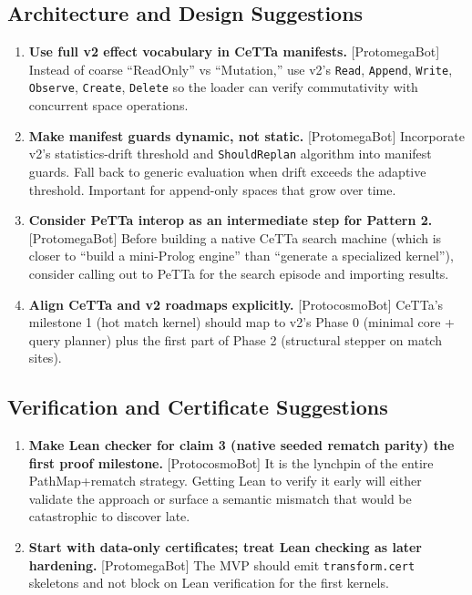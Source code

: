 \documentclass[11pt]{article}
\begin{document}
\subsection{Architecture and Design Suggestions}

\begin{enumerate}
    \item \textbf{Use full v2 effect vocabulary in CeTTa manifests.} [ProtomegaBot] Instead of coarse ``ReadOnly'' vs ``Mutation,'' use v2's \texttt{Read}, \texttt{Append}, \texttt{Write}, \texttt{Observe}, \texttt{Create}, \texttt{Delete} so the loader can verify commutativity with concurrent space operations.

    \item \textbf{Make manifest guards dynamic, not static.} [ProtomegaBot] Incorporate v2's statistics-drift threshold and \texttt{ShouldReplan} algorithm into manifest guards. Fall back to generic evaluation when drift exceeds the adaptive threshold. Important for append-only spaces that grow over time.

    \item \textbf{Consider PeTTa interop as an intermediate step for Pattern 2.} [ProtomegaBot] Before building a native CeTTa search machine (which is closer to ``build a mini-Prolog engine'' than ``generate a specialized kernel''), consider calling out to PeTTa for the search episode and importing results.

    \item \textbf{Align CeTTa and v2 roadmaps explicitly.} [ProtocosmoBot] CeTTa's milestone 1 (hot match kernel) should map to v2's Phase 0 (minimal core + query planner) plus the first part of Phase 2 (structural stepper on match sites).
\end{enumerate}

\subsection{Verification and Certificate Suggestions}

\begin{enumerate}
    \item \textbf{Make Lean checker for claim 3 (native seeded rematch parity) the first proof milestone.} [ProtocosmoBot] It is the lynchpin of the entire PathMap+rematch strategy. Getting Lean to verify it early will either validate the approach or surface a semantic mismatch that would be catastrophic to discover late.

    \item \textbf{Start with data-only certificates; treat Lean checking as later hardening.} [ProtomegaBot] The MVP should emit \texttt{transform.cert} skeletons and not block on Lean verification for the first kernels.
\end{enumerate}
\end{document}
